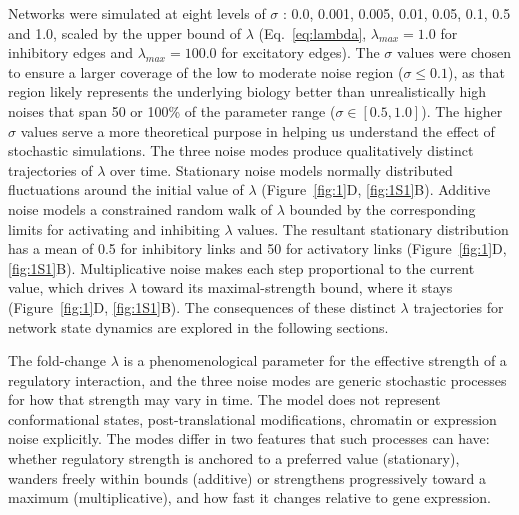 \documentclass[11pt]{article}
\providecommand{\DIFaddtex}[1]{{\protect\color{red}#1}} %
\providecommand{\DIFdeltex}[1]{} %
\providecommand{\DIFaddbegin}{} %
\providecommand{\DIFaddend}{} %
\providecommand{\DIFdelbegin}{} %
\providecommand{\DIFdelend}{} %
\providecommand{\DIFadd}[1]{\texorpdfstring{\DIFaddtex{#1}}{#1}} %
\providecommand{\DIFdel}[1]{\texorpdfstring{\DIFdeltex{#1}}{}} %
\providecommand{\DIFaddincludegraphics}[2][]{\DIFOincludegraphics[#1]{#2}} %
\providecommand{\DIFdelincludegraphics}[2][]{}
\DeclareRobustCommand{\DIFaddbegin}{\DIFOaddbegin \let\includegraphics\DIFaddincludegraphics} %
\DeclareRobustCommand{\DIFaddend}{\DIFOaddend \let\includegraphics\DIFOincludegraphics} %
\DeclareRobustCommand{\DIFdelbegin}{\DIFOdelbegin \let\includegraphics\DIFdelincludegraphics} %
\DeclareRobustCommand{\DIFdelend}{\DIFOaddend \let\includegraphics\DIFOincludegraphics} %
\begin{document}
Networks were simulated at eight levels of $\sigma$ : 0.0, 0.001, 0.005, 0.01, 0.05, 0.1, 0.5 and 1.0, scaled by the upper bound of $\lambda$ (Eq.~\ref{eq:lambda}, $\lambda_{max} = 1.0$ for inhibitory edges and $\lambda_{max} = 100.0$ for excitatory edges). The $\sigma$ values were chosen to ensure a larger coverage of the low to moderate noise region ($\sigma \leq 0.1$), as that region likely represents the underlying biology better than unrealistically high noises that span 50 or 100\% of the parameter range ($\sigma \in [0.5, 1.0]$). The higher $\sigma$ values serve a more theoretical purpose in helping us understand the effect of stochastic simulations. The three noise modes produce qualitatively distinct trajectories of $\lambda$ over time. Stationary noise models normally distributed fluctuations around the initial value of $\lambda$ (Figure~\ref{fig:1}\DIFdelbegin \DIFdel{C, i, \ref{fig:1S1}B, i}\DIFdelend \DIFaddbegin \DIFadd{D, \ref{fig:1S1}B}\DIFaddend ). Additive noise models a constrained random walk of $\lambda$ bounded by the corresponding limits for activating and inhibiting $\lambda$ values. The resultant stationary distribution has a mean of 0.5 for inhibitory links and 50 for activatory links (Figure~\ref{fig:1}\DIFdelbegin \DIFdel{C, ii, \ref{fig:1S1}B, ii}\DIFdelend \DIFaddbegin \DIFadd{D, \ref{fig:1S1}B}\DIFaddend ). Multiplicative noise \DIFdelbegin \DIFdel{scales $\sigma$ by the current $\lambda$ value, such that lower noise values show lower deviation and higher noise values show higher deviation }\DIFdelend \DIFaddbegin \DIFadd{makes each step proportional to the current value, which drives $\lambda$ toward its maximal-strength bound, where it stays }\DIFaddend (Figure~\ref{fig:1}\DIFdelbegin \DIFdel{C, iii, \ref{fig:1S1}B, iii}\DIFdelend \DIFaddbegin \DIFadd{D, \ref{fig:1S1}B}\DIFaddend ). The consequences of these distinct $\lambda$ trajectories for network state dynamics are explored in the following sections.

\DIFaddbegin \DIFadd{The fold-change $\lambda$ is a phenomenological parameter for the effective strength of a regulatory interaction, and the three noise modes are generic stochastic processes for how that strength may vary in time. The model does not represent conformational states, post-translational modifications, chromatin or expression noise explicitly. The modes differ in two features that such processes can have: whether regulatory strength is anchored to a preferred value (stationary), wanders freely within bounds (additive) or strengthens progressively toward a maximum (multiplicative), and how fast it changes relative to gene expression.
}
\end{document}
